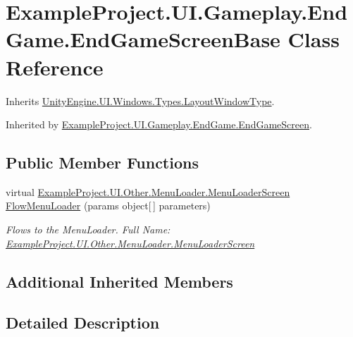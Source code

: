 \hypertarget{class_example_project_1_1_u_i_1_1_gameplay_1_1_end_game_1_1_end_game_screen_base}{}\section{Example\+Project.\+U\+I.\+Gameplay.\+End\+Game.\+End\+Game\+Screen\+Base Class Reference}
\label{class_example_project_1_1_u_i_1_1_gameplay_1_1_end_game_1_1_end_game_screen_base}


Inherits \hyperlink{class_unity_engine_1_1_u_i_1_1_windows_1_1_types_1_1_layout_window_type}{Unity\+Engine.\+U\+I.\+Windows.\+Types.\+Layout\+Window\+Type}.



Inherited by \hyperlink{class_example_project_1_1_u_i_1_1_gameplay_1_1_end_game_1_1_end_game_screen}{Example\+Project.\+U\+I.\+Gameplay.\+End\+Game.\+End\+Game\+Screen}.

\subsection*{Public Member Functions}
\begin{DoxyCompactItemize}
\item 
virtual \hyperlink{class_example_project_1_1_u_i_1_1_other_1_1_menu_loader_1_1_menu_loader_screen}{Example\+Project.\+U\+I.\+Other.\+Menu\+Loader.\+Menu\+Loader\+Screen} \hyperlink{class_example_project_1_1_u_i_1_1_gameplay_1_1_end_game_1_1_end_game_screen_base_a50ce26221087c00658b3a28280318bc7}{Flow\+Menu\+Loader} (params object\mbox{[}$\,$\mbox{]} parameters)
\begin{DoxyCompactList}\small\item\em Flows to the Menu\+Loader. Full Name\+: \hyperlink{class_example_project_1_1_u_i_1_1_other_1_1_menu_loader_1_1_menu_loader_screen}{Example\+Project.\+U\+I.\+Other.\+Menu\+Loader.\+Menu\+Loader\+Screen} \end{DoxyCompactList}\end{DoxyCompactItemize}
\subsection*{Additional Inherited Members}


\subsection{Detailed Description}


